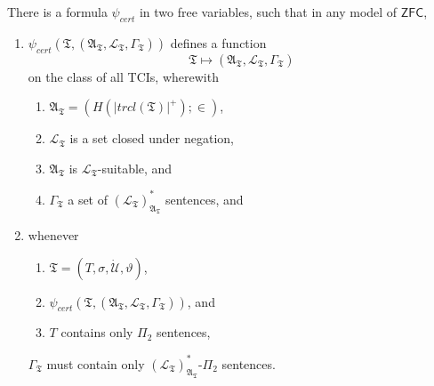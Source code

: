 \documentclass[12pt]{article}
\numberwithin{equation}{section}
\begin{document}
\begin{lem}\label{mcequiv}
There is a formula $\psi_{cert}$ in two free variables, such that in any model of $\mathsf{ZFC}$, 
\begin{enumerate}[label=(\alph*)]
    \item $\psi_{cert}(\mathfrak{T}, (\mathfrak{A}_{\mathfrak{T}}, \mathcal{L}_{\mathfrak{T}}, \Gamma_{\mathfrak{T}}))$ defines a function $$\mathfrak{T} \mapsto (\mathfrak{A}_{\mathfrak{T}}, \mathcal{L}_{\mathfrak{T}}, \Gamma_{\mathfrak{T}})$$ on the class of all TCIs, wherewith
    \begin{enumerate}[label=(\roman*)]
        \item $\mathfrak{A}_{\mathfrak{T}} = (H(|trcl(\mathfrak{T})|^+); \in)$,
        \item $\mathcal{L}_{\mathfrak{T}}$ is a set closed under negation, 
        \item $\mathfrak{A}_{\mathfrak{T}}$ is $\mathcal{L}_{\mathfrak{T}}$-suitable, and
        \item $\Gamma_{\mathfrak{T}}$ a set of $({\mathcal{L}_{\mathfrak{T}}})^*_{\mathfrak{A}_{\mathfrak{T}}}$ sentences, and
    \end{enumerate}
    \item whenever
    \begin{enumerate}[label=(\roman*)]
        \item $\mathfrak{T} = (T, \sigma, \dot{\mathcal{U}}, \vartheta)$, 
        \item $\psi_{cert}(\mathfrak{T}, (\mathfrak{A}_{\mathfrak{T}}, \mathcal{L}_{\mathfrak{T}}, \Gamma_{\mathfrak{T}}))$, and
        \item $T$ contains only $\Pi_2$ sentences, 
    \end{enumerate} 
    $\Gamma_{\mathfrak{T}}$ must contain only $({\mathcal{L}_{\mathfrak{T}}})^{*}_{\mathfrak{A}_{\mathfrak{T}}}$-$\Pi_2$ sentences.
\end{enumerate}
\end{lem}
\end{document}
